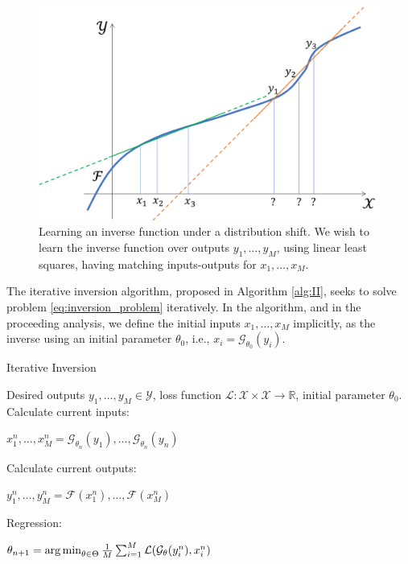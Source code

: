 \documentclass[nohyperref]{article}
\begin{document}
\begin{figure}
    \centering
    \includegraphics[width=\columnwidth]{figures/problem_illustration.png}
    \caption{Learning an inverse function under a distribution shift. We wish to learn the inverse function over outputs $y_1,\dots,y_M$, using linear least squares, having matching inputs-outputs for $x_1,\dots,x_M$.}
    \label{fig:problem_illustration}
\end{figure}

The iterative inversion algorithm, proposed in Algorithm \ref{alg:II}, seeks to solve problem \eqref{eq:inversion_problem} iteratively. In the algorithm, and in the proceeding analysis, we define the initial inputs $x_1,\dots,x_M$ implicitly, as the inverse using an initial parameter $\theta_0$, i.e., $x_i = \mathcal{G}_{\theta_0}(y_i)$.
\begin{algorithm}[]
\caption{Iterative Inversion}\label{alg:II}
\begin{algorithmic}[1]
    \REQUIRE Desired outputs $y_1,\dots,y_M \in \mathcal{Y}$, loss function $\mathcal{L}:\mathcal{X}\times \mathcal{X} \to \mathbb{R}$, initial parameter $\theta_0$.
        \STATE Calculate current inputs:\\
        \begin{center}
            $x_1^n,\dots,x_M^n = \mathcal{G}_{\theta_n}(y_1),\dots, \mathcal{G}_{\theta_n}(y_n)$
        \end{center}
        \STATE Calculate current outputs:\\
        \begin{center}
            $y_1^n,\dots,y_M^n = \mathcal{F}(x^n_1),\dots, \mathcal{F}(x^n_M)$
        \end{center}
        \STATE Regression:
        \begin{center}
            $\theta_{n+1} = \operatorname*{arg\,min}_{\theta \in \Theta} \frac{1}{M}\sum_{i=1}^{M} \mathcal{L}(\mathcal{G}_{\theta}(y^n_i), x^n_i)$
        \end{center}
    \ENDFOR
\end{algorithmic}
\end{algorithm}
\end{document}
